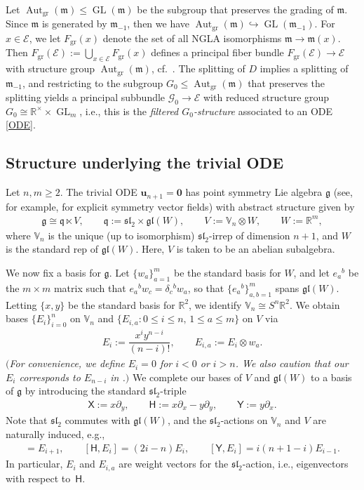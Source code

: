 \documentclass[pdftex]{sigma}%
\newcommand\tensor{\otimes}
\DeclareMathOperator{\gr}{gr}
\DeclareMathOperator{\aut}{Aut}
\newcommand\GL{\operatorname{GL}}
\newcommand{\g}{\mathfrak{g}}
\newcommand{\gl}{\mathfrak{gl}}
\newcommand\bu{\mathbf{u}}
\newcommand\cG{\mathcal{G}}
\renewcommand\gr{\operatorname{gr}}
\newcommand\fg{\mathfrak{g}}
\newcommand\fsl{\mathfrak{sl}}
\newcommand\fm {\mathfrak{m}}
\newcommand\fq {\mathfrak{q}}
\newcommand{\R}{\mathbb{R}}
\newcommand{\V}{\mathbb{V}}
\newcommand\sfX{\mathsf{X}}
\newcommand\sfH{\mathsf{H}}
\newcommand\sfY{\mathsf{Y}}
\newcommand\cE{\mathcal{E}}
\numberwithin{equation}{section}
\begin{document}
Let $\aut_{\gr}(\fm) \le \GL(\fm)$ be the subgroup that preserves the grading of $\fm$. Since $\fm $ is generated by $\fm_{-1}$, then we have $\aut_{\gr}(\mathfrak{m}) \hookrightarrow\GL(\fm_{-1})$. For $x \in \cE$, we let $F_{\gr}(x)$ denote the set of all NGLA isomorphisms $\mathfrak{m} \to \mathfrak{m}(x)$. Then $F_{\gr}(\cE) := \bigcup_{x \in \cE} F_{\gr}(x)$ defines a principal fiber bundle $F_{\gr}(\cE) \to \cE$ with structure group $\aut_{\gr}(\fm)$, cf.\ \cite[Proposition~2.1]{Andreas2017}. The splitting of $D$ implies a splitting of $\fm_{-1}$, and restricting to the subgroup $G_0 \leq \aut_{\gr}(\fm)$ that preserves the splitting yields a principal subbundle $\cG_0 \to \cE$ with reduced structure group $G_0 \cong \R^{\times} \times \GL_m$, i.e., this is the {\em filtered $G_0$-structure} associated to an ODE \eqref{ODE}.

\subsection{Structure underlying the trivial ODE}\label{S:FM}

Let $n,m \geq 2$. The trivial ODE $\bu_{n+1} =\mathbf{0}$ has point symmetry Lie algebra $\g$ (see, for example, \cite[Section~2.2]{CDT2020} for explicit symmetry vector fields) with abstract structure given by
 \begin{align*}
 \g \cong \fq \ltimes V, \qquad
 \fq :=\fsl_2 \times \gl(W), \qquad
 V:= \V_n \tensor W, \qquad
 W :=\R^m,
 \end{align*}
where $\V_n$ is the unique (up to isomorphism) $\fsl_2$-irrep of dimension $n+1$, and $W$ is the standard rep of $\gl(W)$. Here, $V$ is taken to be an abelian subalgebra.

We now fix a basis for $\g$. Let $\{ w_a \}_{a=1}^m$ be the standard basis for $W$, and let $e_a{}^b$ be the $m \times m$ matrix such that $e_a{}^b w_c = \delta_c{}^b w_a$, so that $\bigl\{e_a{}^b\bigr\}_{a,b=1}^m$ spans $\gl(W)$.
Letting $\{x, y\}$ be the standard basis for $\R^2$, we identify $\V_n \cong S^n \R^2$. We obtain bases $\{ E_i \}_{i=0}^n$ on $\V_n$ and $\{ E_{i,a}\colon 0 \leq i \leq n, \, 1 \leq a \leq m \}$ on $V$ via
\begin{align*}
E_i := \dfrac{x^i y^{n-i}}{(n-i)!}, \qquad
E_{i,a} := E_i \otimes w_a.
\end{align*}
$(${\em For convenience, we define $E_i = 0$ for $i < 0$ or $i > n$. We also caution that our $E_i$ corresponds to $E_{n-i}$ in {\rm \cite[{\em Section}~2.1.2]{KT2021}.}}$)$ We complete our bases of $V$ and $\gl(W)$ to a basis of $\fg$ by introducing the standard $\fsl_2$-triple
 \begin{align*}
 \sfX := x\partial_y, \qquad
 \sfH := x\partial_x-y\partial_y, \qquad
 \sfY := y\partial_x.
 \end{align*}
Note that $\fsl_2$ commutes with $\gl(W)$, and the $\fsl_2$-actions on $\V_n$ and $V$ are naturally induced, e.g.,
 \begin{align*}
 [\sfX, E_i] = E_{i+1},\qquad
 [\sfH, E_i] = (2i-n) E_{i}, \qquad
 [\sfY, E_i] = i(n+1-i) E_{i-1}.
 \end{align*}
 In particular, $E_i$ and $E_{i,a}$ are weight vectors for the $\fsl_2$-action, i.e., eigenvectors with respect to~$\sfH$.
\end{document}
